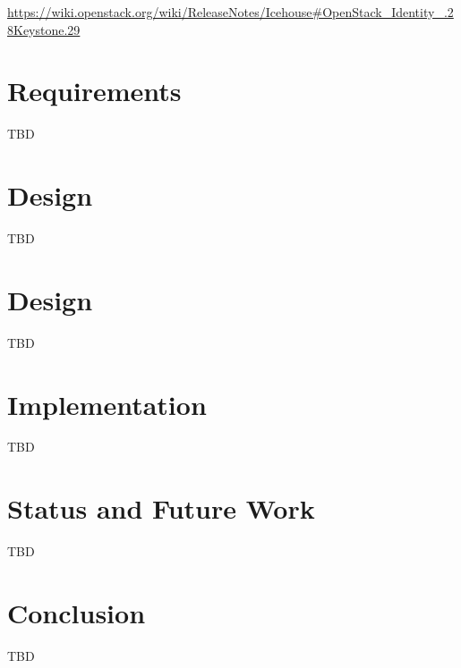 \documentclass{tex/sig-alternate}
\begin{document}
  \url{https://wiki.openstack.org/wiki/ReleaseNotes/Icehouse#OpenStack_Identity_.28Keystone.29}



\section{Requirements}

TBD

\section{Design}

TBD
\section{Design}

TBD

\section{Implementation}

TBD

\section{Status and Future Work}

TBD

\section{Conclusion}

TBD
 
\end{document}
